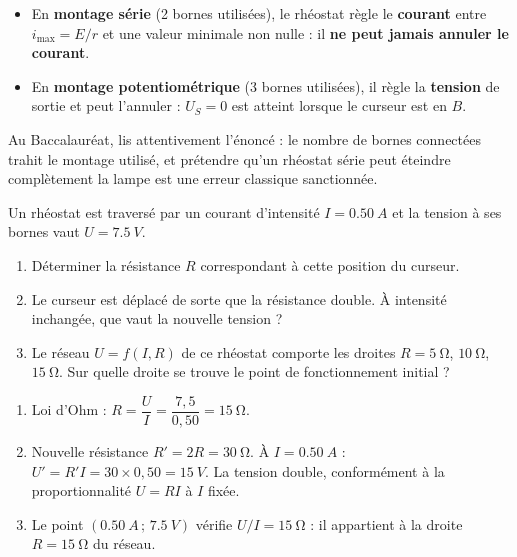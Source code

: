 \documentclass[11pt]{article}
\begin{document}
\begin{attention}
\begin{itemize}
\item En \textbf{montage série} (2 bornes utilisées), le rhéostat règle le \textbf{courant} entre $i_{\max} = E/r$ et une valeur minimale non nulle : il \textbf{ne peut jamais annuler le courant}.
\item En \textbf{montage potentiométrique} (3 bornes utilisées), il règle la \textbf{tension} de sortie et peut l'annuler : $U_S = 0$ est atteint lorsque le curseur est en $B$.
\end{itemize}
Au Baccalauréat, lis attentivement l'énoncé : le nombre de bornes connectées trahit le montage utilisé, et prétendre qu'un rhéostat série peut éteindre complètement la lampe est une erreur classique sanctionnée.
\end{attention}

\begin{exercice}
Un rhéostat est traversé par un courant d'intensité $I = \SI{0,50}{A}$ et la tension à ses bornes vaut $U = \SI{7,5}{V}$.
\begin{enumerate}
\item Déterminer la résistance $R$ correspondant à cette position du curseur.
\item Le curseur est déplacé de sorte que la résistance double. À intensité inchangée, que vaut la nouvelle tension ?
\item Le réseau $U = f(I, R)$ de ce rhéostat comporte les droites $R = \SI{5}{\ohm}$, $\SI{10}{\ohm}$, $\SI{15}{\ohm}$. Sur quelle droite se trouve le point de fonctionnement initial ?
\end{enumerate}
\end{exercice}

\begin{corrige}
\begin{enumerate}
\item Loi d'Ohm : $R = \dfrac{U}{I} = \dfrac{7,5}{0,50} = \SI{15}{\ohm}$.
\item Nouvelle résistance $R' = 2R = \SI{30}{\ohm}$. À $I = \SI{0,50}{A}$ : $U' = R' I = 30 \times 0,50 = \SI{15}{V}$. La tension double, conformément à la proportionnalité $U = RI$ à $I$ fixée.
\item Le point $(\SI{0,50}{A}\,;\,\SI{7,5}{V})$ vérifie $U/I = \SI{15}{\ohm}$ : il appartient à la droite $R = \SI{15}{\ohm}$ du réseau.
\end{enumerate}
\end{corrige}
\end{document}
